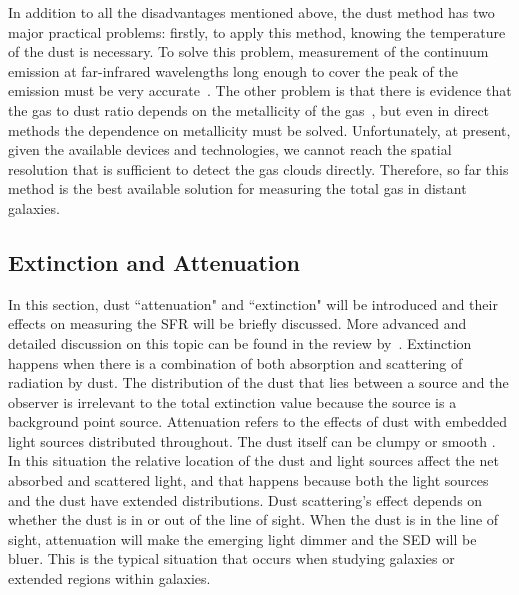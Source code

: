 In addition to all the disadvantages mentioned above, the dust method has two major practical problems: firstly, to apply this method, knowing the temperature of the dust is necessary. 
To solve this problem, measurement of the continuum emission at far-infrared wavelengths long enough to cover the peak of the emission must be very accurate~\citep{Ealas12}. 
The other problem is that there is evidence that the gas to dust ratio depends on the metallicity of the gas~\citep{Lisenfeld98, Draine07}, but even in direct methods the dependence on metallicity must be solved. 
Unfortunately, at present, given the available devices and technologies, we cannot reach the spatial resolution that is sufficient to detect the gas clouds directly. %
Therefore, so far this method is the best available solution for measuring the total gas in distant galaxies. 

\subsection{Extinction and Attenuation} %
\label{sec: extinction}
In this section, dust ``attenuation" and ``extinction" will be introduced and their effects on measuring the SFR will be briefly discussed. %
More advanced and detailed discussion on this topic can be found in the review by~\citep{Calzetti01}. 
Extinction happens when there is a combination of both absorption and scattering of radiation by dust. The distribution of the dust that lies between a source and the observer is irrelevant to the total extinction value because the source is a background point source. %
Attenuation refers to the effects of dust with embedded light sources distributed throughout. 
The dust itself can be clumpy or smooth \citep{Calzetti13}. 
In this situation the relative location of the dust and light sources affect the net absorbed and scattered light, and that happens because both the light sources and the dust have extended distributions. 
Dust scattering's effect depends on whether the dust is in or out of the line of sight. 
When the dust is in the line of sight, attenuation will make the emerging light dimmer and the SED will be bluer. %
This is the typical situation that occurs when studying galaxies or extended regions within galaxies.

